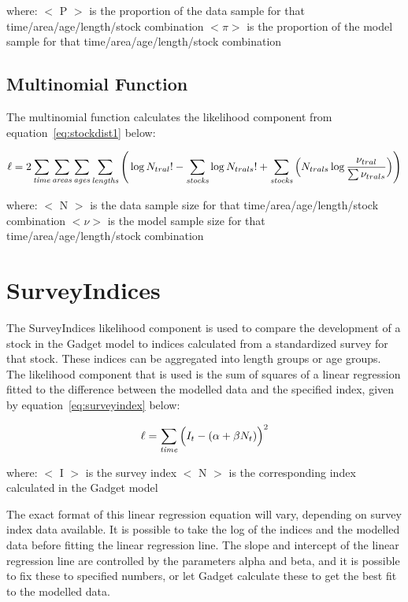 \documentclass[10pt,twoside]{book}
\begin{document}
where:\newline
$<$ P $>$ is the proportion of the data sample for that time/area/age/length/stock combination\newline
$<\pi>$ is the proportion of the model sample for that time/area/age/length/stock combination

\subsection{Multinomial Function}
The multinomial function calculates the likelihood component from equation~\ref{eq:stockdist1} below:

\begin{equation}\label{eq:stockdist1}
\ell = 2 \sum_{\it time}\sum_{\it areas}\sum_{\it ages}\sum_{\it lengths} \Bigg( \log N_{tral}! - \sum_{\it stocks} \log N_{trals}! + \sum_{\it stocks} \Big( N_{trals} \log {\frac{\nu_{tral}}{\sum \nu_{trals}}} \Big)\Bigg)
\end{equation}

where:\newline
$<$ N $>$ is the data sample size for that time/area/age/length/stock combination\newline
$<\nu>$ is the model sample size for that time/area/age/length/stock combination

\section{SurveyIndices}\label{sec:surveyindices}
The SurveyIndices likelihood component is used to compare the development of a stock in the Gadget model to indices calculated from a standardized survey for that stock.  These indices can be aggregated into length groups or age groups.  The likelihood component that is used is the sum of squares of a linear regression fitted to the difference between the modelled data and the specified index, given by equation~\ref{eq:surveyindex} below:

\begin{equation}\label{eq:surveyindex}
\ell = \sum_{\it time}\Big(I_{t} - (\alpha + \beta N_{t})\Big)^2
\end{equation}

where:\newline
$<$ I $>$ is the survey index\newline
$<$ N $>$ is the corresponding index calculated in the Gadget model

\bigskip
The exact format of this linear regression equation will vary, depending on survey index data available.  It is possible to take the log of the indices and the modelled data before fitting the linear regression line.  The slope and intercept of the linear regression line are controlled by the parameters alpha and beta, and it is possible to fix these to specified numbers, or let Gadget calculate these to get the best fit to the modelled data.
\end{document}
